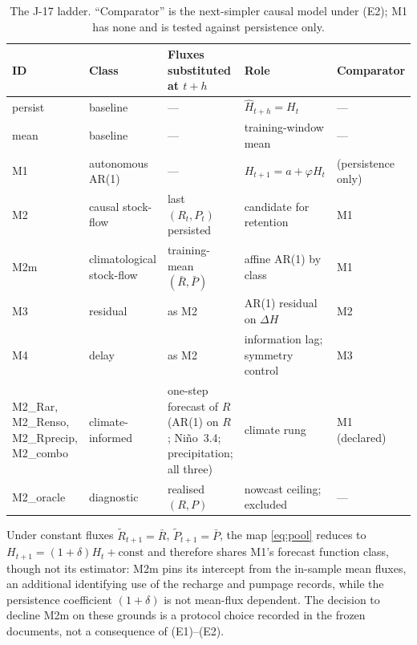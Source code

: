 \begin{table}[!htb]
\centering\small
\caption{The J-17 ladder. ``Comparator'' is the next-simpler causal model under (E2); M1 has none and is tested against persistence only.}
\label{tab:edwladder}
\begin{tabularx}{\textwidth}{@{}>{\raggedright\arraybackslash}p{}>{\raggedright\arraybackslash}p{}>{\raggedright\arraybackslash}p{}L>{\raggedright\arraybackslash}p{0.14\textwidth}@{}}
\toprule
ID & Class & Fluxes substituted at $t+h$ & Role & Comparator \\
\midrule
persist & baseline & --- & $\hat H_{t+h}=H_t$ & --- \\
mean & baseline & --- & training-window mean & --- \\
M1 & autonomous AR(1) & --- & $H_{t+1}=a+\varphi H_t$ & (persistence only) \\
M2 & causal stock-flow & last $(R_t,P_t)$ persisted & candidate for retention & M1 \\
M2m & climatological stock-flow & training-mean $(\bar R,\bar P)$ & affine AR(1) by class & M1 \\
M3 & residual & as M2 & AR(1) residual on $\Delta H$ & M2 \\
M4 & delay & as M2 & information lag; symmetry control & M3 \\
M2\_Rar, M2\_Renso, M2\_Rprecip, M2\_combo & climate-informed & one-step forecast of $R$ (AR(1) on $R$; Ni\~no~3.4; precipitation; all three) & climate rung & M1 (declared) \\
M2\_oracle & diagnostic & realised $(R,P)$ & nowcast ceiling; excluded & --- \\
\bottomrule
\end{tabularx}
\end{table}

\begin{remark}\label{rem:class}
Under constant fluxes $\tilde R_{t+1}=\bar R$, $\tilde P_{t+1}=\bar P$, the map \eqref{eq:pool} reduces to $H_{t+1}=(1+\delta)H_t+\mathrm{const}$ and therefore shares M1's forecast function class, though not its estimator: M2m pins its intercept from the in-sample mean fluxes, an additional identifying use of the recharge and pumpage records, while the persistence coefficient $(1+\delta)$ is not mean-flux dependent. The decision to decline M2m on these grounds is a protocol choice recorded in the frozen documents, not a consequence of (E1)--(E2).
\end{remark}

